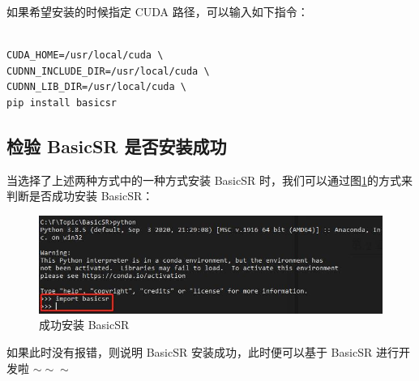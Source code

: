 \documentclass[../main.tex]{subfiles}
\begin{document}







如果希望安装的时候指定 CUDA 路径，可以输入如下指令：

\begin{verbatim}

CUDA_HOME=/usr/local/cuda \
CUDNN_INCLUDE_DIR=/usr/local/cuda \
CUDNN_LIB_DIR=/usr/local/cuda \
pip install basicsr

\end{verbatim}

\subsection{检验 BasicSR 是否安装成功}

当选择了上述两种方式中的一种方式安装 BasicSR 时，我们可以通过图\ref{fig:correct-install}的方式来判断是否成功安装 BasicSR：

    \begin{figure}[H]
	\begin{center}
		\includegraphics[width=0.8\linewidth]{figures/installation_correct_install.jpg}
		\caption{成功安装 BasicSR}
		\label{fig:correct-install}
	\end{center}
	\vspace{-0.5cm}
    \end{figure}

如果此时没有报错，则说明 BasicSR 安装成功，此时便可以基于 BasicSR 进行开发啦 $\sim \sim \sim$
\end{document}
